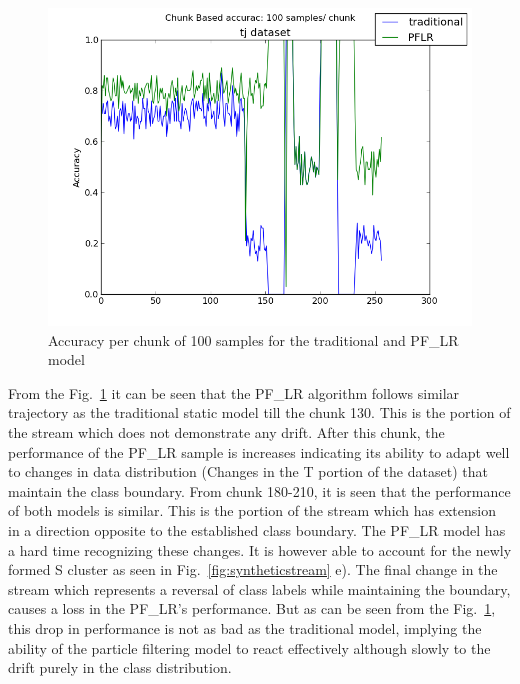 \documentclass[conference]{IEEEtran}
\begin{document}
\begin{figure}
\captionsetup{justification=centering}
\centering
\includegraphics[scale=0.42]{fig/chunk_100_traditional_PFLR.png}
\caption{Accuracy per chunk of 100 samples for the traditional and PF\_LR model}
\label{fig:chunk_100_tr} 
\end{figure}


From the Fig.~\ref{fig:chunk_100_tr} it can be seen that the PF\_LR algorithm follows similar trajectory as the traditional static model till the chunk 130. This is the portion of the stream which does not demonstrate any drift. After this chunk, the performance of the PF\_LR sample is increases indicating its ability to adapt well to changes in data distribution (Changes in the T portion of the dataset) that maintain the class boundary. From chunk 180-210, it is seen that the performance of both models is similar. This is the portion of the stream which has extension in a direction opposite to the established class boundary. The PF\_LR model has a hard time recognizing these changes. It is however able to account for the newly formed S cluster as seen in Fig.~\ref{fig:syntheticstream} e). The final change in the stream which represents a reversal of class labels while maintaining the boundary, causes a loss in the PF\_LR's performance. But as can be seen from the Fig.~\ref{fig:chunk_100_tr}, this drop in performance is not as bad as the traditional model, implying the ability of the particle filtering model to react effectively although slowly to the drift purely in the class distribution. 
\end{document}
